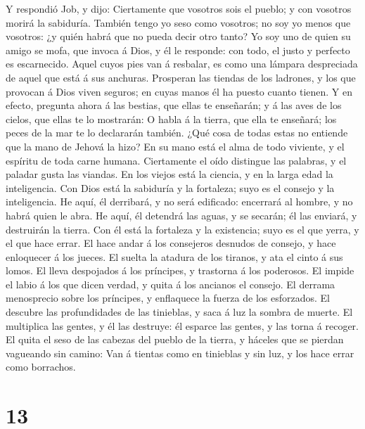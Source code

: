  Y respondió Job, y dijo:  Ciertamente que
vosotros sois el pueblo; y con vosotros morirá la sabiduría.
 También tengo yo seso como vosotros; no soy yo menos que
vosotros: ¿y quién habrá que no pueda decir otro tanto?  Yo
soy uno de quien su amigo se mofa, que invoca á Dios, y él le responde:
con todo, el justo y perfecto es escarnecido.  Aquel cuyos
pies van á resbalar, es como una lámpara despreciada de aquel que está á
sus anchuras.  Prosperan las tiendas de los ladrones, y los
que provocan á Dios viven seguros; en cuyas manos él ha puesto cuanto
tienen.  Y en efecto, pregunta ahora á las bestias, que
ellas te enseñarán; y á las aves de los cielos, que ellas te lo
mostrarán:  O habla á la tierra, que ella te enseñará; los
peces de la mar te lo declararán también.  ¿Qué cosa de
todas estas no entiende que la mano de Jehová la hizo?  En
su mano está el alma de todo viviente, y el espíritu de toda carne
humana.  Ciertamente el oído distingue las palabras, y el
paladar gusta las viandas.  En los viejos está la ciencia,
y en la larga edad la inteligencia.  Con Dios está la
sabiduría y la fortaleza; suyo es el consejo y la inteligencia.
 He aquí, él derribará, y no será edificado: encerrará al
hombre, y no habrá quien le abra.  He aquí, él detendrá las
aguas, y se secarán; él las enviará, y destruirán la tierra.
 Con él está la fortaleza y la existencia; suyo es el que
yerra, y el que hace errar.  El hace andar á los consejeros
desnudos de consejo, y hace enloquecer á los jueces.  El
suelta la atadura de los tiranos, y ata el cinto á sus lomos.
 El lleva despojados á los príncipes, y trastorna á los
poderosos.  El impide el labio á los que dicen verdad, y
quita á los ancianos el consejo.  El derrama menosprecio
sobre los príncipes, y enflaquece la fuerza de los esforzados.
 El descubre las profundidades de las tinieblas, y saca á
luz la sombra de muerte.  El multiplica las gentes, y él
las destruye: él esparce las gentes, y las torna á recoger.
 El quita el seso de las cabezas del pueblo de la tierra, y
háceles que se pierdan vagueando sin camino:  Van á tientas
como en tinieblas y sin luz, y los hace errar como borrachos.

\hypertarget{section-12}{%
\section{13}\label{section-12}}


